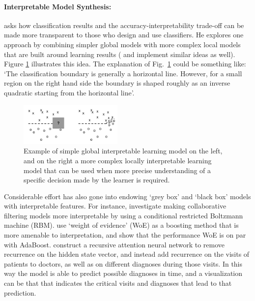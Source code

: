 \paragraph{Interpretable Model Synthesis:}
\citet{Ruping2006-xj} asks how classification results and the accuracy-interpretability trade-off can be made more transparent to those who design and use classifiers. He explores one approach by combining simpler global models with more complex local models that are built around learning results (\citet{Otte2013-oo} and \citet{Ribeiro2016-uc} implement similar ideas as well). 
Figure \ref{fig:ruping} illustrates this idea. 
The explanation of Fig.~\ref{fig:ruping} could be something like: `The classification boundary is generally a horizontal line. However, for a small region on the right hand side the boundary is shaped roughly as an inverse quadratic starting from the horizontal line'.

\begin{figure}[htbp]
    \centering
    \includegraphics[width=0.45\textwidth]{Figures/global_local}
    \caption{Example of simple global interpretable learning model on the left, and on the right a more complex locally interpretable learning model that can be used when more precise understanding of a specific decision made by the learner is required. }
    \label{fig:ruping}
    \vspace{-0.1 in}
\end{figure}

Considerable effort has also gone into endowing `grey box' and `black box' models with interpretable features. 
For instance, \citet{Abdollahi2016-vn} investigate making collaborative filtering models more interpretable by using a conditional restricted Boltzmann machine (RBM). \citet{Ridgeway1998-lv} use `weight of evidence' (WoE) as a boosting method that is more amenable to interpretation, and show that the performance WoE is on par with AdaBoost. \citet{Choi2016-by} construct a recursive attention neural network to remove recurrence on the hidden state vector, and instead add recurrence on the visits of patients to doctors, as well as on different diagnoses during those visits. In this way the model is able to predict possible diagnoses in time, and a visualization can be that that indicates the critical visits and diagnoses that lead to that prediction.

